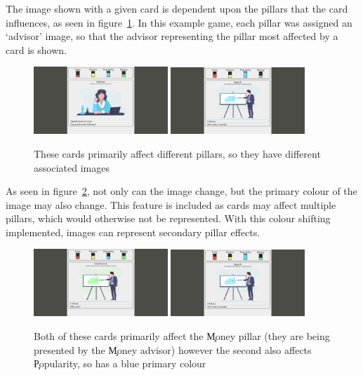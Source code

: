 The image shown with a given card is dependent upon the pillars that the card influences, as seen in figure~\ref{fig:advisor_comp}. In this example game, each pillar was assigned an `advisor' image, so that the advisor representing the pillar most affected by a card is shown.

\begin{figure}[!h]
	\centering
	\includegraphics[width=0.45\textwidth]{./images/design/game.png}
	\includegraphics[width=0.45\textwidth]{./images/design/ecman_blue.png}
	\caption{These cards primarily affect different pillars, so they have different associated images}
	\label{fig:advisor_comp}
\end{figure}

As seen in figure~\ref{fig:colour_comp}, not only can the image change, but the primary colour of the image may also change. This feature is included as cards may affect multiple pillars, which would otherwise not be represented. With this colour shifting implemented, images can represent secondary pillar effects.

\begin{figure}[!h]
	\centering
	\includegraphics[width=0.45\textwidth]{./images/design/ecman_green.png}
	\includegraphics[width=0.45\textwidth]{./images/design/ecman_blue.png}
	\caption{Both of these cards primarily affect the \c{Money} pillar (they are being presented by the \c{Money} advisor) however the second also affects \c{Popularity}, so has a blue primary colour}
	\label{fig:colour_comp}
\end{figure}

